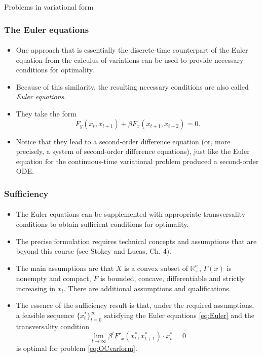 \documentclass[10pt]{beamer}
\theoremstyle{definition}
\begin{document}
\begin{section}{Problems in variational form}
\begin{frame}[fragile]
\frametitle{The Euler equations}
\framesubtitle{}
\begin{itemize}\itemsep1em
\item One approach that is essentially the discrete-time counterpart of the Euler equation from the calculus of variations can be used to provide necessary conditions for optimality.
\item Because of this similarity, the resulting necessary conditions are also called \emph{Euler equations}.
\item They take the form
\begin{equation}\label{eq:Euler}
F_y(x_t,x_{t+1})+\beta F_x(x_{t+1},x_{t+2})=0.
\end{equation}
\item Notice that they lead to a second-order difference equation (or, more precisely, a system of second-order difference equations), just like the Euler equation for the continuous-time variational problem produced a second-order ODE.
\end{itemize}
\end{frame}

\begin{frame}[fragile]
\frametitle{Sufficiency}
\framesubtitle{}
\begin{itemize}\itemsep1em
\item The Euler equations can be supplemented with appropriate transversality conditions to obtain sufficient conditions for optimality.
\item The precise formulation requires technical concepts and assumptions that are beyond this course (see Stokey and Lucas, Ch. 4).
\item The main assumptions are that $ X $ is a convex subset of $ \mathbb{R}^n_{+} $, $ \Gamma (x) $ is nonempty and compact, $ F $ is bounded, concave, differentiable and strictly increasing in $ x_t $. There are additional assumptions and qualifications.
\item The essence of the sufficiency result is that, under the required assumptions, a feasible sequence $ \{x^*_t\}_{t=0}^{\infty} $ satisfying the Euler equations \eqref{eq:Euler} and the transversality condition \[ \lim\limits_{t\rightarrow \infty}\beta^t F'_x(x_t^*,x_{t+1}^*)\cdot x^*_t = 0 \] is optimal for problem \eqref{eq:OCvarform}.
\end{itemize}


\end{frame}




\end{section}
\end{document}
